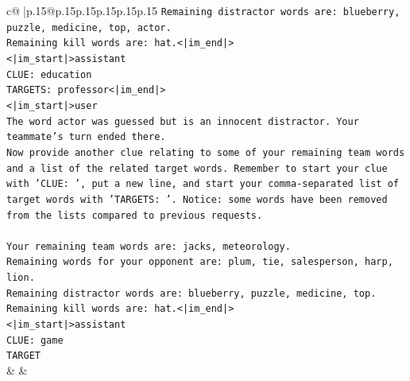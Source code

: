 \documentclass{article}
\begin{document}
{\begin{supertabular}{c@{$\;$}|p{.15\linewidth}@{}p{.15\linewidth}p{.15\linewidth}p{.15\linewidth}p{.15\linewidth}p{.15\linewidth}}
{{{\texttt{Remaining distractor words are: blueberry, puzzle, medicine, top, actor.} \\
\texttt{Remaining kill words are: hat.<|im\_end|>} \\
\texttt{<|im\_start|>assistant} \\
\texttt{CLUE: education} \\
\texttt{TARGETS: professor<|im\_end|>} \\
\texttt{<|im\_start|>user} \\
\texttt{The word actor was guessed but is an innocent distractor. Your teammate's turn ended there.} \\
\texttt{Now provide another clue relating to some of your remaining team words and a list of the related target words. Remember to start your clue with 'CLUE: ', put a new line, and start your comma{-}separated list of target words with 'TARGETS: '. Notice: some words have been removed from the lists compared to previous requests.} \\
\\ 
\texttt{Your remaining team words are: jacks, meteorology.} \\
\texttt{Remaining words for your opponent are: plum, tie, salesperson, harp, lion.} \\
\texttt{Remaining distractor words are: blueberry, puzzle, medicine, top.} \\
\texttt{Remaining kill words are: hat.<|im\_end|>} \\
\texttt{<|im\_start|>assistant} \\
\texttt{CLUE: game} \\
\texttt{TARGET} \\
            }
        }
    }
    & & \\ \\


\end{supertabular}}
\end{document}
